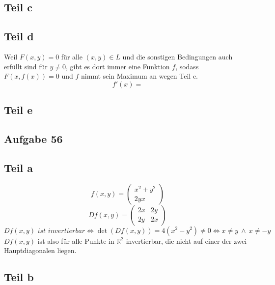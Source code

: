 \documentclass[10pt,a4paper]{article}
\begin{document}
\subsection*{Teil c}

\subsection*{Teil d}

Weil $F(x, y) = 0$ für alle $(x, y) \in L$ und die sonstigen Bedingungen auch erfüllt sind für $y \ne 0$, gibt es dort immer eine Funktion $f$, sodass $F(x, f(x)) = 0$ und $f$ nimmt sein Maximum an wegen Teil c.
\begin{equation}
f'(x) = 
\end{equation}

\subsection*{Teil e}

\subsection*{Aufgabe 56}

\subsection*{Teil a}

\begin{equation}
f(x, y) = \begin{pmatrix}
x^{2} + y^{2}\\
2yx
\end{pmatrix}
\end{equation}
\begin{equation}
Df(x, y) = \begin{pmatrix}
2x & 2y\\
2y & 2x
\end{pmatrix}
\end{equation}
\begin{equation}
Df(x, y)\textit{ ist invertierbar} \Leftrightarrow \det(Df(x, y)) = 4(x^{2} - y^{2}) \ne 0 \Leftrightarrow x \ne y\ \land\ x \ne -y
\end{equation}
$Df(x, y)$ ist also für alle Punkte in $\mathbb{R}^{2}$ invertierbar, die nicht auf einer der zwei Hauptdiagonalen liegen.

\subsection*{Teil b}
\end{document}
